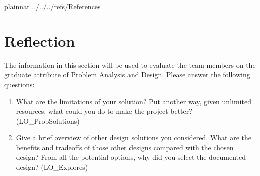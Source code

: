 \documentclass[12pt, titlepage]{article}
\begin{document}
 {plainnat}
 {../../../refs/References}



\section{Reflection}

The information in this section will be used to evaluate the team members on the
graduate attribute of Problem Analysis and Design.  Please answer the following questions:

\begin{enumerate}
  \item What are the limitations of your solution?  Put another way, given
  unlimited resources, what could you do to make the project better? (LO\_ProbSolutions)
  \item Give a brief overview of other design solutions you considered.  What
  are the benefits and tradeoffs of those other designs compared with the chosen
  design?  From all the potential options, why did you select the documented design?
  (LO\_Explores)
\end{enumerate}
\end{document}
